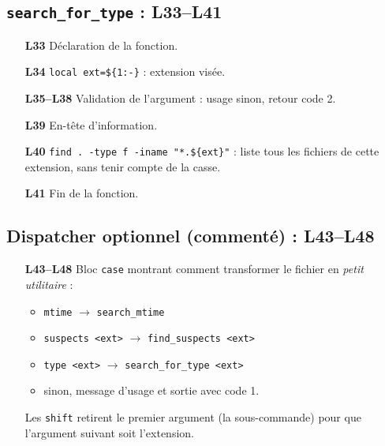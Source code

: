 \documentclass[11pt,a4paper]{article}
\begin{document}
\subsection*{\texttt{search\_for\_type} : L33--L41}
\begin{enumerate}
  \item[\textbf{L33}] Déclaration de la fonction.
  \item[\textbf{L34}] \texttt{local ext=\$\{1:-\}} : extension visée.
  \item[\textbf{L35--L38}] Validation de l'argument : usage sinon, retour code 2.
  \item[\textbf{L39}] En-tête d'information.
  \item[\textbf{L40}] \texttt{find . -type f -iname "*.\$\{ext\}"} : liste tous les fichiers de cette extension, sans tenir compte de la casse.
  \item[\textbf{L41}] Fin de la fonction.
\end{enumerate}

\subsection*{Dispatcher optionnel (commenté) : L43--L48}
\begin{enumerate}
  \item[\textbf{L43--L48}] Bloc \texttt{case} montrant comment transformer le fichier en \emph{petit utilitaire} :
  \begin{itemize}
    \item \texttt{mtime} $\rightarrow$ \texttt{search\_mtime}
    \item \texttt{suspects <ext>} $\rightarrow$ \texttt{find\_suspects <ext>}
    \item \texttt{type <ext>} $\rightarrow$ \texttt{search\_for\_type <ext>}
    \item sinon, message d'usage et sortie avec code 1.
  \end{itemize}
  Les \texttt{shift} retirent le premier argument (la sous-commande) pour que l'argument suivant soit l'extension.
\end{enumerate}
\end{document}
